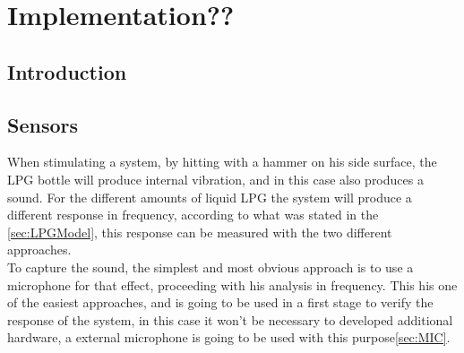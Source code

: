 \cleardoublepage
\chapter{Implementation??} \label{chap:trans}

\section{Introduction}
\section{Sensors} %
When stimulating a system, by hitting with a hammer on his side surface, the LPG bottle will produce internal vibration, and in this case also produces a sound. For the different amounts of liquid LPG the system will produce a different response in frequency, according to what was stated in the \ref{sec:LPGModel}, this response can be measured with the two different approaches.\\
To capture the sound, the simplest and most obvious approach is to use a microphone for that effect, proceeding with his analysis in frequency. This his one of the easiest approaches, and is going to be used in a first stage to verify the response of the system, in this case it won't be necessary to developed additional hardware, a external microphone is going to be used with this purpose\ref{sec:MIC}.\\

